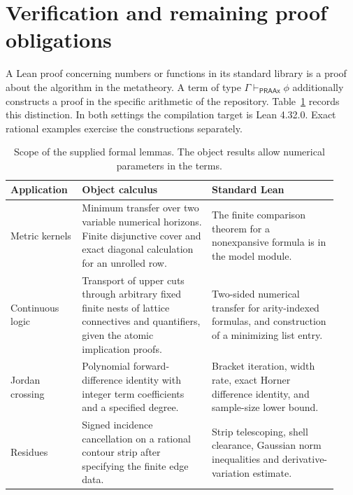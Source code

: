 \section{Verification and remaining proof obligations}\label{sec:verification}

A Lean proof concerning numbers or functions in its standard library is a proof about the algorithm in the metatheory. A term of type \(\Gamma\vdash_{\mathsf{PRAAx}}\phi\) additionally constructs a proof in the specific arithmetic of the repository. Table~\ref{tab:verify} records this distinction. In both settings the compilation target is Lean 4.32.0. Exact rational examples exercise the constructions separately.

\begin{table}[ht]
\centering\small
\renewcommand{\arraystretch}{1.15}
\begin{tabular}{@{}p{0.20\linewidth}p{0.37\linewidth}p{0.36\linewidth}@{}}
\toprule
Application & Object calculus & Standard Lean \\
\midrule
Metric kernels & Minimum transfer over two variable numerical horizons. Finite disjunctive cover and exact diagonal calculation for an unrolled row. & The finite comparison theorem for a nonexpansive formula is in the model module.\\
Continuous logic & Transport of upper cuts through arbitrary fixed finite nests of lattice connectives and quantifiers, given the atomic implication proofs. & Two-sided numerical transfer for arity-indexed formulas, and construction of a minimizing list entry.\\
Jordan crossing & Polynomial forward-difference identity with integer term coefficients and a specified degree. & Bracket iteration, width rate, exact Horner difference identity, and sample-size lower bound.\\
Residues & Signed incidence cancellation on a rational contour strip after specifying the finite edge data. & Strip telescoping, shell clearance, Gaussian norm inequalities and derivative-variation estimate.\\
\bottomrule
\end{tabular}
\caption{Scope of the supplied formal lemmas. The object results allow numerical parameters in the terms.}\label{tab:verify}
\end{table}

